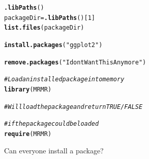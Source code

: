 \documentclass[xcolor=dvipsnames]{beamer}
\makeatletter
\newcommand{\hlnum}[1]{\textcolor[rgb]{0.686,0.059,0.569}{#1}}%
\newcommand{\hlstr}[1]{\textcolor[rgb]{0.192,0.494,0.8}{#1}}%
\newcommand{\hlcom}[1]{\textcolor[rgb]{0.678,0.584,0.686}{\textit{#1}}}%
\newcommand{\hlstd}[1]{\textcolor[rgb]{0.345,0.345,0.345}{#1}}%
\newcommand{\hlkwb}[1]{\textcolor[rgb]{0.69,0.353,0.396}{#1}}%
\newcommand{\hlkwd}[1]{\textcolor[rgb]{0.737,0.353,0.396}{\textbf{#1}}}%
\newenvironment{kframe}{%
 \def\at@end@of@kframe{}%
 \ifinner\ifhmode%
  \def\at@end@of@kframe{\end{minipage}}%
  \begin{minipage}{\columnwidth}%
 \fi\fi%
 \def\FrameCommand##1{\hskip\@totalleftmargin \hskip-\fboxsep
 \colorbox{shadecolor}{##1}\hskip-\fboxsep
     \hskip-\linewidth \hskip-\@totalleftmargin \hskip\columnwidth}%
 \MakeFramed {\advance\hsize-\width
   \@totalleftmargin\z@ \linewidth\hsize
   \@setminipage}}%
 {\par\unskip\endMakeFramed%
 \at@end@of@kframe}
\newenvironment{knitrout}{}{} %
\makeatother
\begin{document}
\begin{frame}[fragile]
\begin{knitrout}
\color{fgcolor}\begin{kframe}
\begin{alltt}
\hlkwd{.libPaths}\hlstd{()}
\hlstd{packageDir} \hlkwb{=} \hlkwd{.libPaths}\hlstd{()[}\hlnum{1}\hlstd{]}
\hlkwd{list.files}\hlstd{(packageDir)}

\hlkwd{install.packages}\hlstd{(}\hlstr{"ggplot2"}\hlstd{)}

\hlkwd{remove.packages}\hlstd{(}\hlstr{"IdontWantThisAnymore"}\hlstd{)}

\hlcom{# Load an installed package into memory}
\hlkwd{library}\hlstd{(MRMR)}

\hlcom{# Will load the package and return TRUE/FALSE}

\hlcom{# if the package could be loaded}
\hlkwd{require}\hlstd{(MRMR)}
\end{alltt}
\end{kframe}
\end{knitrout}

\end{frame}

\begin{frame}
Can everyone install a package?
\end{frame}
\end{document}
